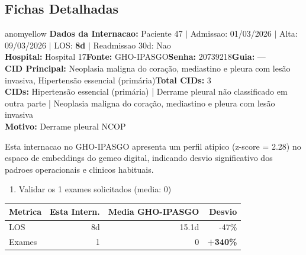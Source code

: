 \documentclass[a4paper,10pt]{article}
\begin{document}
\subsection{Fichas Detalhadas}
\begin{anomalycard}[Internacao 10 | GHO-IPASGO | MODERADO (z=2.28)]{anomyellow}
\textbf{Dados da Internacao:} Paciente 47 $\mid$ Admissao: 01/03/2026 $\mid$ Alta: 09/03/2026 $\mid$ LOS: \textbf{8d} $\mid$ Readmissao 30d: Nao\\
\textbf{Hospital:} Hospital 17\quad\textbf{Fonte:} GHO-IPASGO\quad\textbf{Senha:} 20739218\quad\textbf{Guia:} ---\\
\textbf{CID Principal:} {\small Neoplasia maligna do coração, mediastino e pleura com lesão invasiva, Hipertensão essencial (primária)}\quad\textbf{Total CIDs:} 3\\

\textbf{CIDs:} {\scriptsize Hipertensão essencial (primária) | Derrame pleural não classificado em outra parte | Neoplasia maligna do coração, mediastino e pleura com lesão invasiva}\\

\textbf{Motivo:} {\scriptsize Derrame pleural NCOP}\\

\vspace{2pt}\begin{tcolorbox}[colback=severityred!20,colframe=anomyellow,title={\textbf{Interpretacao de Negocio}},fonttitle=\bfseries\small,left=4pt,right=4pt,top=3pt,bottom=3pt]
{\small Esta internacao no GHO-IPASGO apresenta um perfil atipico (z-score = 2.28) no espaco de embeddings do gemeo digital, indicando desvio significativo dos padroes operacionais e clinicos habituais.}
\end{tcolorbox}
\begin{tcolorbox}[colback=severityyellow!30,colframe=anomorange,title={\textbf{Recomendacoes Especificas}},fonttitle=\bfseries\small,left=4pt,right=4pt,top=3pt,bottom=3pt]
\begin{enumerate}[nosep,leftmargin=16pt]
\item {\small Validar os 1 exames solicitados (media: 0)}
\end{enumerate}
\end{tcolorbox}
\begin{center}\begin{tabular}{l r r r}\toprule\textbf{Metrica} & \textbf{Esta Intern.} & \textbf{Media GHO-IPASGO} & \textbf{Desvio} \\\midrule
LOS & 8d & 15.1d & -47\% \\
Exames & 1 & 0 & \textcolor{anomred}{\textbf{+340\%}} \\
\bottomrule\end{tabular}\end{center}


\end{anomalycard}
\end{document}
